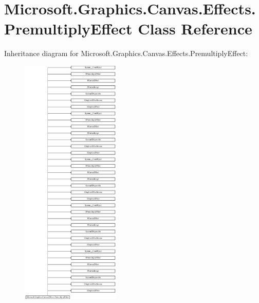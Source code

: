 \hypertarget{class_microsoft_1_1_graphics_1_1_canvas_1_1_effects_1_1_premultiply_effect}{}\section{Microsoft.\+Graphics.\+Canvas.\+Effects.\+Premultiply\+Effect Class Reference}
\label{class_microsoft_1_1_graphics_1_1_canvas_1_1_effects_1_1_premultiply_effect}
Inheritance diagram for Microsoft.\+Graphics.\+Canvas.\+Effects.\+Premultiply\+Effect\+:\begin{figure}[H]
\begin{center}
\leavevmode
\includegraphics[height=12.000000cm]{class_microsoft_1_1_graphics_1_1_canvas_1_1_effects_1_1_premultiply_effect}
\end{center}
\end{figure}
